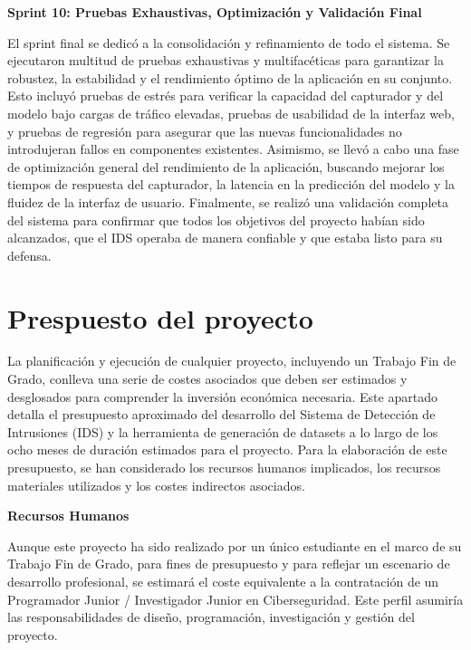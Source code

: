 \textbf{Sprint 10: Pruebas Exhaustivas, Optimización y Validación Final}

El sprint final se dedicó a la consolidación y refinamiento de todo el sistema. Se ejecutaron multitud de pruebas exhaustivas y multifacéticas para garantizar la robustez, la estabilidad y el rendimiento óptimo de la aplicación en su conjunto. Esto incluyó pruebas de estrés para verificar la capacidad del capturador y del modelo bajo cargas de tráfico elevadas, pruebas de usabilidad de la interfaz web, y pruebas de regresión para asegurar que las nuevas funcionalidades no introdujeran fallos en componentes existentes. Asimismo, se llevó a cabo una fase de optimización general del rendimiento de la aplicación, buscando mejorar los tiempos de respuesta del capturador, la latencia en la predicción del modelo y la fluidez de la interfaz de usuario. Finalmente, se realizó una validación completa del sistema \cite{NIST2020SP800-115} para confirmar que todos los objetivos del proyecto habían sido alcanzados, que el IDS operaba de manera confiable y que estaba listo para su defensa.

\section{Prespuesto del proyecto}

La planificación y ejecución de cualquier proyecto, incluyendo un Trabajo Fin de Grado, conlleva una serie de costes asociados que deben ser estimados y desglosados para comprender la inversión económica necesaria. Este apartado detalla el presupuesto aproximado del desarrollo del Sistema de Detección de Intrusiones (IDS) y la herramienta de generación de datasets a lo largo de los ocho meses de duración estimados para el proyecto. Para la elaboración de este presupuesto, se han considerado los recursos humanos implicados, los recursos materiales utilizados y los costes indirectos asociados.

\textbf{Recursos Humanos}

Aunque este proyecto ha sido realizado por un único estudiante en el marco de su Trabajo Fin de Grado, para fines de presupuesto y para reflejar un escenario de desarrollo profesional, se estimará el coste equivalente a la contratación de un Programador Junior / Investigador Junior en Ciberseguridad. Este perfil asumiría las responsabilidades de diseño, programación, investigación y gestión del proyecto.

